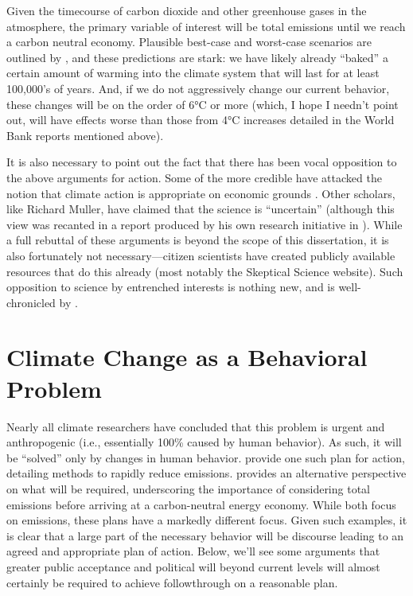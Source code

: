 Given the timecourse of carbon dioxide and other greenhouse gases in the
atmosphere, the primary variable of interest will be total emissions until we
reach a carbon neutral economy. Plausible best-case and worst-case scenarios are
outlined by \textcite{archer_millennial_2008}, and these predictions are stark:
we have likely already “baked” a certain amount of warming into the climate
system that will last for at least 100,000's of years. And, if we do not
aggressively change our current behavior, these changes will be on the order of
6°C or more (which, I hope I needn't point out, will have effects worse than
those from 4°C increases detailed in the World Bank reports mentioned above).

It is also necessary to point out the fact that there has been vocal opposition
to the above arguments for action. Some of the more credible have attacked the
notion that climate action is appropriate on economic grounds
\parencite[e.g.,][]{lomborg_cool_2007}. Other scholars, like Richard Muller,
have claimed that the science is “uncertain” (although this view was
recanted in a report produced by his own research initiative
in ). 
While a full rebuttal of these arguments is beyond the
scope of this dissertation, it is also fortunately not necessary---citizen
scientists have created publicly available resources that do this already (most
notably the Skeptical Science website).  Such opposition to science by
entrenched interests is nothing new, and is well-chronicled by
\textcite{oreskes_merchants_2010}.

\section{Climate Change as a Behavioral Problem}

Nearly all climate researchers have concluded that this problem is urgent and
anthropogenic (i.e., essentially 100\% caused by human behavior). 
As such, it will be ``solved'' only by changes in human behavior.
\textcite{harte_cool_2008} provide one such plan for action, detailing methods
to rapidly reduce emissions. \textcite{schrag_hope_2011} provides an alternative
perspective on what will be required, underscoring the importance of considering
total emissions before arriving at a carbon-neutral energy economy. While both
focus on emissions, these plans have a markedly different focus. Given such
examples, it is clear that a large part of the necessary behavior will be
discourse leading to an agreed and appropriate plan of action. Below, we'll see
some arguments that greater public acceptance and political will beyond
current levels will almost certainly be required to achieve followthrough on a
reasonable plan.

